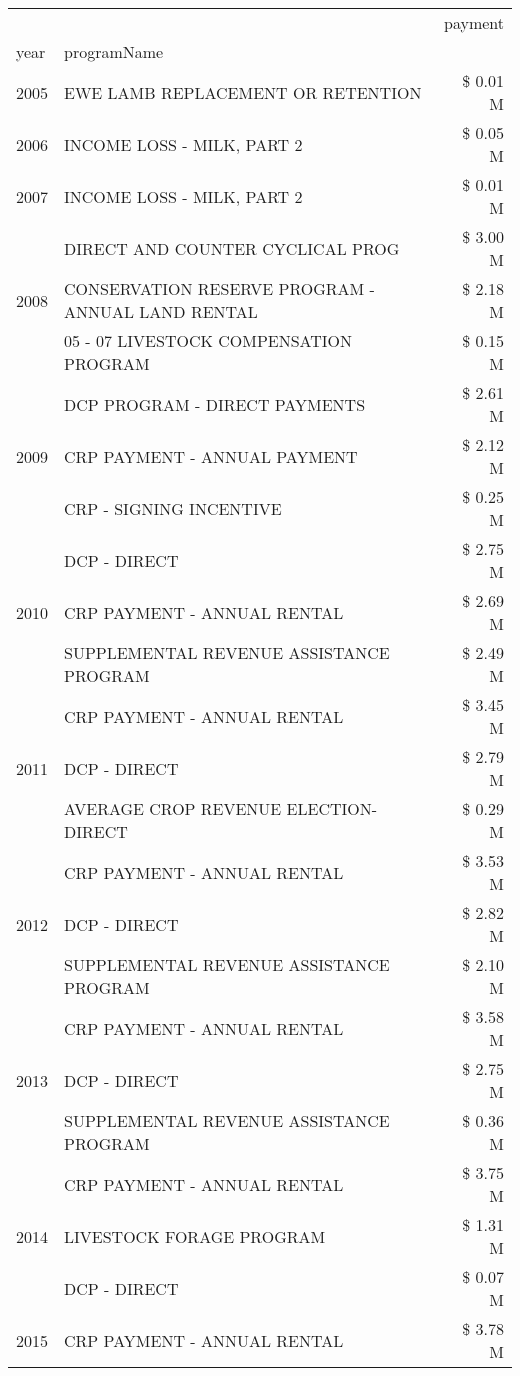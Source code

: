 \begin{tabular}{llr}
\toprule
 &  & payment \\
year & programName &  \\
\midrule
2005 & EWE LAMB REPLACEMENT OR RETENTION & \$ 0.01 M \\
\cline{1-3}
2006 & INCOME LOSS - MILK, PART 2 & \$ 0.05 M \\
\cline{1-3}
2007 & INCOME LOSS - MILK, PART 2 & \$ 0.01 M \\
\cline{1-3}
\multirow[t]{3}{*}{2008} & DIRECT AND COUNTER CYCLICAL PROG & \$ 3.00 M \\
 & CONSERVATION RESERVE PROGRAM - ANNUAL LAND RENTAL & \$ 2.18 M \\
 & 05 - 07 LIVESTOCK COMPENSATION PROGRAM & \$ 0.15 M \\
\cline{1-3}
\multirow[t]{3}{*}{2009} & DCP PROGRAM - DIRECT PAYMENTS & \$ 2.61 M \\
 & CRP PAYMENT - ANNUAL PAYMENT & \$ 2.12 M \\
 & CRP - SIGNING INCENTIVE & \$ 0.25 M \\
\cline{1-3}
\multirow[t]{3}{*}{2010} & DCP - DIRECT & \$ 2.75 M \\
 & CRP PAYMENT - ANNUAL RENTAL & \$ 2.69 M \\
 & SUPPLEMENTAL REVENUE ASSISTANCE PROGRAM & \$ 2.49 M \\
\cline{1-3}
\multirow[t]{3}{*}{2011} & CRP PAYMENT - ANNUAL RENTAL & \$ 3.45 M \\
 & DCP - DIRECT & \$ 2.79 M \\
 & AVERAGE CROP REVENUE ELECTION-DIRECT & \$ 0.29 M \\
\cline{1-3}
\multirow[t]{3}{*}{2012} & CRP PAYMENT - ANNUAL RENTAL & \$ 3.53 M \\
 & DCP - DIRECT & \$ 2.82 M \\
 & SUPPLEMENTAL REVENUE ASSISTANCE PROGRAM & \$ 2.10 M \\
\cline{1-3}
\multirow[t]{3}{*}{2013} & CRP PAYMENT - ANNUAL RENTAL & \$ 3.58 M \\
 & DCP - DIRECT & \$ 2.75 M \\
 & SUPPLEMENTAL REVENUE ASSISTANCE PROGRAM & \$ 0.36 M \\
\cline{1-3}
\multirow[t]{3}{*}{2014} & CRP PAYMENT - ANNUAL RENTAL & \$ 3.75 M \\
 & LIVESTOCK FORAGE PROGRAM & \$ 1.31 M \\
 & DCP - DIRECT & \$ 0.07 M \\
\cline{1-3}
\multirow[t]{3}{*}{2015} & CRP PAYMENT - ANNUAL RENTAL & \$ 3.78 M \\

\end{tabular}
